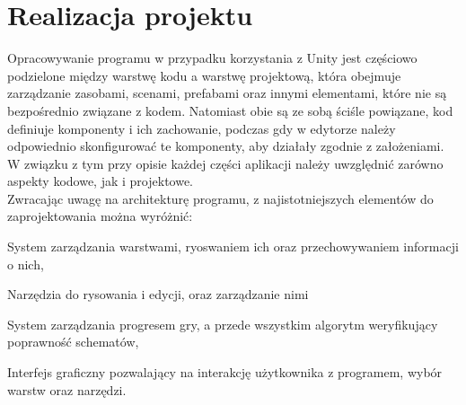 \chapter{Realizacja projektu}
\label{ch:realizacja_projektu}

Opracowywanie programu w przypadku korzystania z Unity jest częściowo podzielone między warstwę kodu a warstwę projektową,
która obejmuje zarządzanie zasobami, scenami, prefabami oraz innymi elementami, które nie są bezpośrednio związane z kodem.
Natomiast obie są ze sobą ściśle powiązane, kod definiuje komponenty i ich zachowanie,
podczas gdy w edytorze należy odpowiednio skonfigurować te komponenty, aby działały zgodnie z założeniami.
W związku z tym przy opisie każdej części aplikacji należy uwzględnić zarówno aspekty kodowe, jak i projektowe.\\
\indent Zwracając uwagę na architekturę programu, z najistotniejszych elementów do zaprojektowania można wyróżnić:

\begin{citemize}
    \item System zarządzania warstwami, ryoswaniem ich oraz przechowywaniem informacji o nich,
    \item Narzędzia do rysowania i edycji, oraz zarządzanie nimi
    \item System zarządzania progresem gry, a przede wszystkim algorytm weryfikujący poprawność schematów,
    \item Interfejs graficzny pozwalający na interakcję użytkownika z programem, wybór warstw oraz narzędzi.
\end{citemize}


